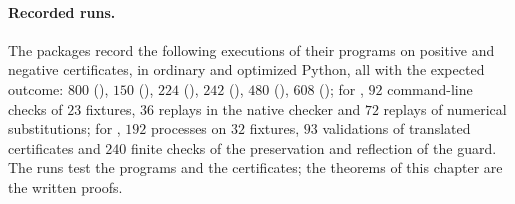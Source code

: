 \paragraph{Recorded runs.}
The packages record the following executions of their programs on positive
and negative certificates, in ordinary and optimized Python, all with the
expected outcome: $800$ (), $150$
(), $224$ (), $242$
(), $480$ (), $608$
(); for , $92$ command-line checks of
$23$ fixtures, $36$ replays in the native checker and $72$ replays of
numerical substitutions; for , $192$ processes on $32$
fixtures, $93$ validations of translated certificates and $240$ finite
checks of the preservation and reflection of the guard.  The runs test the
programs and the certificates; the theorems of this chapter are the written
proofs.

